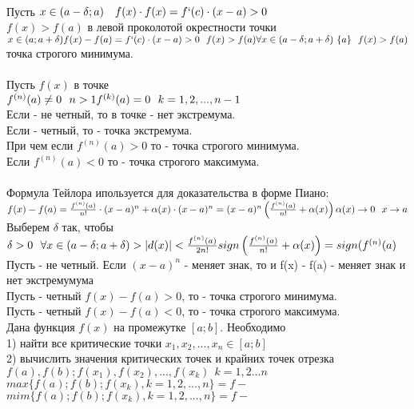  \\
Пусть $x \in (a - \delta; a) \quad f(x) \cdot f(x) = f`(c) \cdot (x - a) > 0 $ \\  %
$f(x) > f(a)$ в левой проколотой окрестности точки  \\
$x \in (a; a + \delta) \\
f(x) - f(a) = f`(c) \cdot (x - a) > 0 ~~ f(x) > f(a) \\
\forall x \in (a - \delta; a+ \delta) \ \{a\} ~~ f(x) > f(a)$ \\
точка строгого минимума. \\

 \\
Пусть $f(x)$ в точке  \\
$f^{(n)} (a) \neq 0 ~~ n > 1 \\
f^{(k)} (a) = 0 ~~ k = 1, 2, ..., n-1$ \\ 
Если  - не четный, то в точке  - нет экстремума. \\
Если  - четный, то  - точка экстремума. \\
При чем если $f^{(n)} (a) > 0$ то  - точка строгого минимума. \\
Если  $f^{(n)} (a) < 0$ то  - точка строгого максимума. \\

 \\
Формула Тейлора ипользуется для доказательства в форме Пиано: \\
$f(x) - f(a) = \frac {f^{(n)} (a)} {n!} \cdot (x - a)^n + \alpha (x) \cdot (x - a)^n = (x - a)^n \left ( \frac {f^{(n)} (a)} { n!} + \alpha(x) \right) \\
\alpha (x) \to 0 ~~ x \to a$ \\
Выберем $\delta$ так, чтобы $\delta > 0 ~~ \forall x \in (a - \delta; a + \delta) > |d(x)| < \frac {f^{(n)}(a)}{2n!} \\
sign \left ( \frac {f^{(n)} (a)} {n!} + \alpha(x) \right) = sign (f^{(n)} (a)$ \\
Пусть  - не четный. Если $(x - a)^n$ - меняет знак, то и f(x) - f(a) - меняет знак и нет экстремумума \\
Пусть  - четный $f(x) - f(a) > 0$, то  - точка строгого минимума. \\
Пусть  - четный $f(x) - f(a) < 0$, то  - точка строгого максимума. \\

Дана функция $f(x)$ на промежутке $[a;b]$. Необходимо \\
1) найти все критические точки $x_{1}, x_{2}, ..., x_{n} \in [a; b]$ \\
2) вычислить значения критических точек и крайних точек отрезка 
$f(a), f(b); f(x_{1}), f(x_{2}), ..., f(x_{k}) ~~ k = 1, 2 ... n$ \\

$max \{f(a); f(b); f(x_{k}), k = 1, 2, ..., n\} = f - $  \\
$mim \{f(a); f(b); f(x_{k}), k = 1, 2, ..., n\} = f - $  \\